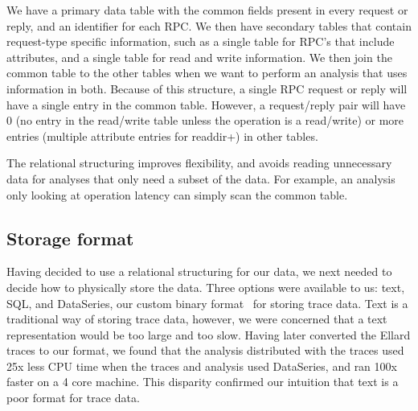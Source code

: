 We have a primary data table with the common fields present in every
request or reply, and an identifier for each RPC.  We then have
secondary tables that contain request-type specific information, such
as a single table for RPC's that include attributes, and a single
table for read and write information.  We then join the common table
to the other tables when we want to perform an analysis that uses
information in both.  Because of this structure, a single RPC request
or reply will have a single entry in the common table.  However, a
request/reply pair will have 0 (no entry in the read/write table
unless the operation is a read/write) or more entries (multiple
attribute entries for readdir+) in other tables.

The relational structuring improves flexibility, and avoids reading unnecessary data for
analyses that only need a subset of the data.
For example, an analysis only looking at operation
latency can simply scan the common table.

\subsection{Storage format}

Having decided to use a relational structuring for our data, we next
needed to decide how to physically store the data.  Three
options were available to us: text, SQL, and DataSeries, our custom
binary format~\cite{DSTechnicalReportSnapshot} for storing trace data.
Text is a traditional way of storing trace data, however, we were
concerned that a text representation would be too large and too slow.
Having later converted the Ellard traces to our format, we found that
the analysis distributed with the traces used 25x less CPU time when
the traces and analysis used DataSeries, and ran 100x faster on a 4
core machine. This disparity confirmed our intuition that text is a
poor format for trace data.



